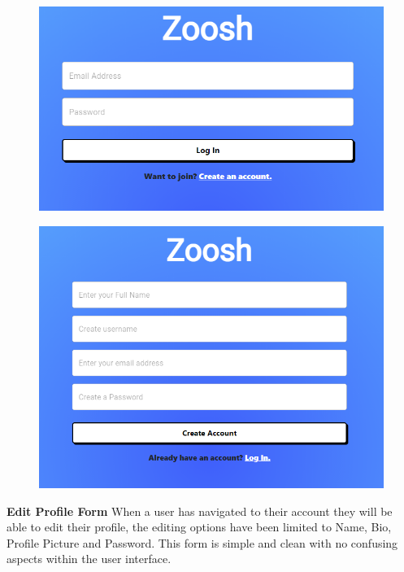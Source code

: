 \begin{figure}[H]
  \centering
  \includegraphics[scale=0.45]{img/login.PNG}
  \label{fig:Login Screen}
\end{figure}

\begin{figure}[H]
  \centering
  \includegraphics[scale=0.45]{img/join.PNG}
  \label{fig:Join Screen}
\end{figure}

\textbf{Edit Profile Form}
\newline
When a user has navigated to their account they will be able to edit their profile, the editing options have been limited to Name, Bio, Profile Picture and Password. This form is simple and clean with no confusing aspects within the user interface.

